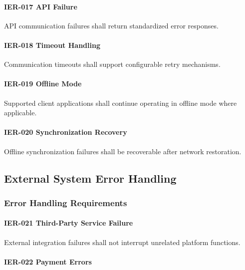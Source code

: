 \paragraph{IER-017 API Failure}

API communication failures shall return standardized error responses.

\paragraph{IER-018 Timeout Handling}

Communication timeouts shall support configurable retry mechanisms.

\paragraph{IER-019 Offline Mode}

Supported client applications shall continue operating in offline mode
where applicable.

\paragraph{IER-020 Synchronization Recovery}

Offline synchronization failures shall be recoverable after network
restoration.


\subsection{External System Error Handling}

\subsubsection*{Error Handling Requirements}

\paragraph{IER-021 Third-Party Service Failure}

External integration failures shall not interrupt unrelated platform
functions.

\paragraph{IER-022 Payment Errors}

